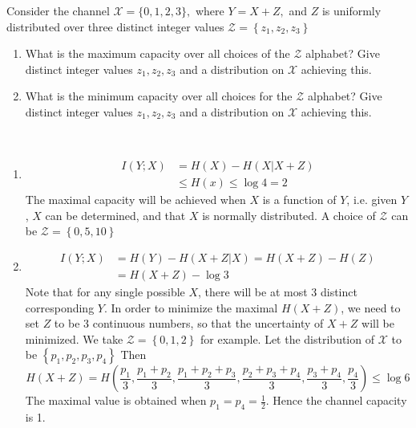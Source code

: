 \begin{exercise}{Consider the channel $\mathcal{X}=\{0,1,2,3\},$ where $Y=X+Z,$ and $Z$ is uniformly distributed over three distinct integer values $\mathcal{Z}=\left\{z_{1}, z_{2}, z_{3}\right\}$
  \begin{enumerate}
    \item What is the maximum capacity over all choices of the $\mathcal{Z}$ alphabet? Give distinct integer values $z_{1}, z_{2}, z_{3}$ and a distribution on     $\mathcal{X}$ achieving this.
    \item What is the minimum capacity over all choices for the $\mathcal{Z}$ alphabet? Give distinct integer values $z_{1}, z_{2}, z_{3}$ and a distribution on
    $\mathcal{X}$ achieving this.
  \end{enumerate} }
  \begin{solution}
  \par{~}
  \begin{enumerate}
    \item { 
    \begin{equation}
      \begin{aligned}
        I(Y;X) &= H(X) - H(X|X+Z) \\
        &\le H(x)  \le \log 4 = 2
      \end{aligned}
    \end{equation}  
    The maximal capacity will be achieved when $X$ is a function of $Y$, i.e. given $Y$, $X$ can be determined, and that $X$ is normally distributed. A choice of $\mathcal{Z}$ can be $\mathcal{Z}=\left\{0, 5, 10 \right\}$ }
    \item {
      \begin{equation}
        \begin{aligned}
          I(Y;X) &= H(Y) - H(X+Z|X) = H(X+Z) - H(Z) \\
          &= H(X+Z) - \log 3 
        \end{aligned}
      \end{equation}
      Note that for any single possible $X$, there will be at most 3 distinct corresponding $Y$. In order to minimize the maximal $H(X+Z)$, we need to set $Z$ to be 3 continuous numbers, so that the uncertainty of $X+Z$ will be minimized. We take $\mathcal{Z}=\left\{0, 1, 2 \right\}$ for example. Let the distribution of $\mathcal{X}$ to be $\left\{p_1, p_2, p_3,p_4 \right\}$ Then
      \begin{equation}
          H(X+Z) = H(\frac{p_1}{3}, \frac{p_1 + p_2}{3}, \frac{p_1+p_2+p_3}{3}, \frac{p_2+p_3+p_4}{3}, \frac{p_3+p_4}{3}, \frac{p_4}{3}) \le \log 6
      \end{equation}
      The maximal value is obtained when $p_1 = p_4 =  \frac{1}{2}$. Hence the channel capacity is 1.
     }
  \end{enumerate}
  \end{solution}
  \label{ex4}
\end{exercise}

